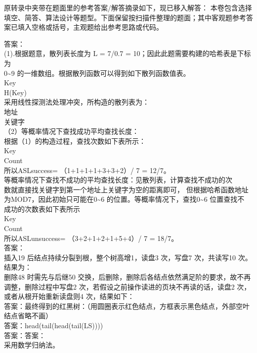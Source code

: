 \begin{question}
\begin{solution}
\medskip
\noindent 原转录中夹带在题面里的参考答案/解答摘录如下，现已移入解答：
本卷包含选择填空、简答、算法设计等题型。下面保留按扫描件整理的题面；其中客观题参考答案已填入空格或括号，主观题给出参考思路或代码。

答案：\\
(1).根据题意，散列表长度为 L = 7/0.7 = 10；因此此题需要构建的哈希表是下标为\\
0\textasciitilde{}9 的一维数组。根据散列函数可以得到如下散列函数值表。\\
Key\\
H(Key)\\
采用线性探测法处理冲突，所构造的散列表为：\\
地址\\
关键字\\
（2）等概率情况下查找成功平均查找长度：\\
根据（1）的构造过程，查找次数如下表所示：\\
Key\\
Count\\
所以ASLsuccess= （1+1+1+1+3+3+2）/ 7 = 12/7。\\
等概率情况下查找不成功的平均查找长度：见散列表，计算查找不成功的次\\
数就直接找关键字到第一个地址上关键字为空的距离即可， 但根据哈希函数地址\\
为MOD7，因此初始只可能在0\textasciitilde{}6 的位置。等概率情况下，查找0\textasciitilde{}6 位置查找不\\
成功的次数表如下表所示\\
Key\\
Count\\
所以ASLunsuccess= （3+2+1+2+1+5+4）/ 7 = 18/7。\\
答案：\\
插入19 后结点持续分裂到根，整个树高增1，读盘3 次，写盘7 次，共读写10 次。\\
结果为：\\
删除48 时需先与后继50 交换，后删除，删除后各结点依然满足阶的要求，故不再\\
调整，删除过程中写盘2 次，若假设之前操作读进的页块不再读的话，读盘2 次，\\
或者从根开始重新读盘则4 次，结果如下：\\
答案：最终得到的红黑树：（用圆圈表示红色结点，方框表示黑色结点，外部空叶\\
结点省略不画）\\
答案：head(tail(head(tail(LS))))\\
答案：答案：\\
采用数学归纳法。\\

\end{solution}
\end{question}
